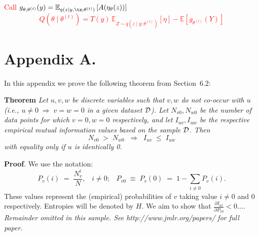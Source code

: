 \documentclass[twoside,11pt]{article}
\newcommand{\dataset}{{\cal D}}
\newcommand{\fracpartial}[2]{\frac{\partial #1}{\partial  #2}}
\begin{document}
\newpage

\textcolor{red}{
Call $g_{\theta, \theta^{(t)}}(y) = \mathbb{E}_{q(z \mid y, \tz; \theta^{(t)})} \left[ A(\eta_\theta(z)) \right]$
$$
Q(\theta \mid \theta^{(t)}) = T(y) \, \mathbb{E}_{Z\sim q(z \mid y; \theta^{(t)})} \left[ {\eta} \right] - \mathbb{E} \left[ g_{\theta^{(t)}}(Y) \right]
$$
}

\newpage
\appendix
\section*{Appendix A.}
\label{app:theorem}



In this appendix we prove the following theorem from
Section~6.2:

\noindent
{\bf Theorem} {\it Let $u,v,w$ be discrete variables such that $v, w$ do
not co-occur with $u$ (i.e., $u\neq0\;\Rightarrow \;v=w=0$ in a given
dataset $\dataset$). Let $N_{v0},N_{w0}$ be the number of data points for
which $v=0, w=0$ respectively, and let $I_{uv},I_{uw}$ be the
respective empirical mutual information values based on the sample
$\dataset$. Then
\[
	N_{v0} \;>\; N_{w0}\;\;\Rightarrow\;\;I_{uv} \;\leq\;I_{uw}
\]
with equality only if $u$ is identically 0.} \hfill\BlackBox

\noindent
{\bf Proof}. We use the notation:
\[
P_v(i) \;=\;\frac{N_v^i}{N},\;\;\;i \neq 0;\;\;\;
P_{v0}\;\equiv\;P_v(0)\; = \;1 - \sum_{i\neq 0}P_v(i).
\]
These values represent the (empirical) probabilities of $v$
taking value $i\neq 0$ and 0 respectively.  Entropies will be denoted
by $H$. We aim to show that $\fracpartial{I_{uv}}{P_{v0}} < 0$....\\

{\noindent \em Remainder omitted in this sample. See http://www.jmlr.org/papers/ for full paper.}



\vskip 0.2in

\end{document}
